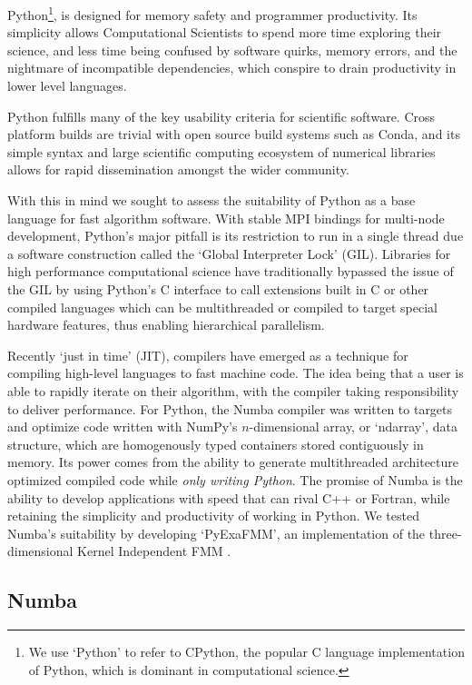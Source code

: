 Python\footnote{We use `Python' to refer to CPython, the popular C language implementation of Python, which is dominant in computational science.}, is designed for memory safety and programmer productivity. Its simplicity allows Computational Scientists to spend more time exploring their science, and less time being confused by software quirks, memory errors, and the nightmare of incompatible dependencies, which conspire to drain productivity in lower level languages.

Python fulfills many of the key usability criteria for scientific software. Cross platform builds are trivial with open source build systems such as Conda, and its simple syntax and large scientific computing ecosystem of numerical libraries allows for rapid dissemination amongst the wider community.

With this in mind we sought to assess the suitability of Python as a base language for fast algorithm software. With stable MPI bindings \cite{dalcin2021mpi4py} for multi-node development, Python's major pitfall is its restriction to run in a single thread due a software construction called the `Global Interpreter Lock' (GIL). Libraries for high performance computational science have traditionally bypassed the issue of the GIL by using Python's C interface to call extensions built in C or other compiled languages which can be multithreaded or compiled to target special hardware features, thus enabling hierarchical parallelism.

Recently `just in time' (JIT), compilers have emerged as a technique for compiling high-level languages to fast machine code. The idea being that a user is able to rapidly iterate on their algorithm, with the compiler taking responsibility to deliver performance. For Python, the Numba compiler \cite{lam2015numba} was written to targets and optimize code written with NumPy's $n$-dimensional array, or `ndarray', data structure, which are homogenously typed containers stored contiguously in memory. Its power comes from the ability to generate multithreaded architecture optimized compiled code while \textit{only writing Python}. The promise of Numba is the ability to develop applications with speed that can rival C++ or Fortran, while retaining the simplicity and productivity of working in Python. We tested Numba's suitability by developing `PyExaFMM', an implementation of the three-dimensional Kernel Independent FMM \cite{kailasa2022pyexafmm}.

\subsection*{Numba}

